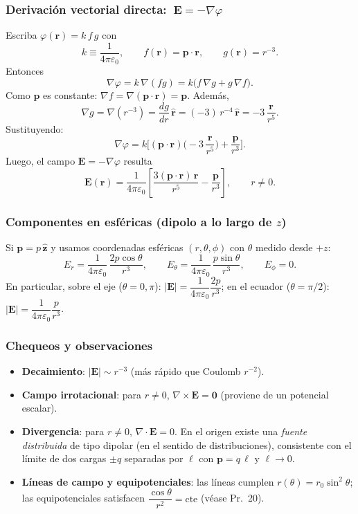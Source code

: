 \documentclass{article}
\begin{document}
\subsubsection*{Derivación vectorial directa: $\ \mathbf E=-\nabla\varphi$}
Escriba $\varphi(\mathbf r)=k\,f\,g$ con
\[
k\equiv\frac{1}{4\pi\varepsilon_0},\qquad
f(\mathbf r)=\mathbf p\!\cdot\!\mathbf r,\qquad
g(\mathbf r)=r^{-3}.
\]
Entonces
\[
\nabla\varphi=k\,\nabla(fg)=k\big(f\,\nabla g+g\,\nabla f\big).
\]
Como $\mathbf p$ es constante: $\nabla f=\nabla(\mathbf p\!\cdot\!\mathbf r)=\mathbf p$.  
Además,
\[
\nabla g=\nabla(r^{-3})=\frac{dg}{dr}\,\hat{\mathbf r}=(-3)\,r^{-4}\,\hat{\mathbf r}
=-3\,\frac{\mathbf r}{r^{5}}.
\]
Sustituyendo:
\[
\nabla\varphi
=k\Big[(\mathbf p\!\cdot\!\mathbf r)\Big(-3\,\frac{\mathbf r}{r^{5}}\Big)
+\frac{\mathbf p}{r^{3}}\Big].
\]
Luego, el campo $\mathbf E=-\nabla\varphi$ resulta
\[
\boxed{\;
\mathbf E(\mathbf r)=\frac{1}{4\pi\varepsilon_0}\left[
\frac{3(\mathbf p\!\cdot\!\mathbf r)\,\mathbf r}{r^{5}}
-\frac{\mathbf p}{r^{3}}
\right],\qquad r\neq 0.\;}
\]

\subsubsection*{Componentes en esféricas (dipolo a lo largo de $z$)}
Si $\mathbf p=p\,\hat{\mathbf z}$ y usamos coordenadas esféricas $(r,\theta,\phi)$ con $\theta$ medido desde $+z$:
\[
\boxed{\;
E_r=\frac{1}{4\pi\varepsilon_0}\,\frac{2p\cos\theta}{r^{3}},\qquad
E_\theta=\frac{1}{4\pi\varepsilon_0}\,\frac{p\sin\theta}{r^{3}},\qquad
E_\phi=0.\;}
\]
En particular, sobre el eje ($\theta=0,\pi$): $|\mathbf E|=\dfrac{1}{4\pi\varepsilon_0}\dfrac{2p}{r^{3}}$;  
en el ecuador ($\theta=\pi/2$): $|\mathbf E|=\dfrac{1}{4\pi\varepsilon_0}\dfrac{p}{r^{3}}$.

\subsubsection*{Chequeos y observaciones}
\begin{itemize}
\item \textbf{Decaimiento}: $|\mathbf E|\sim r^{-3}$ (más rápido que Coulomb $r^{-2}$).
\item \textbf{Campo irrotacional}: para $r\neq 0$, $\nabla\times\mathbf E=\mathbf 0$ (proviene de un potencial escalar).
\item \textbf{Divergencia}: para $r\neq 0$, $\nabla\!\cdot\!\mathbf E=0$. En el origen existe una \emph{fuente distribuida} de tipo dipolar (en el sentido de distribuciones), consistente con el límite de dos cargas $\pm q$ separadas por $\boldsymbol\ell$ con $\mathbf p=q\,\boldsymbol\ell$ y $\boldsymbol\ell\to 0$.
\item \textbf{Líneas de campo y equipotenciales}: las líneas cumplen $r(\theta)=r_0\sin^2\theta$; las equipotenciales satisfacen $\dfrac{\cos\theta}{r^2}=\text{cte}$ (véase Pr.~20).
\end{itemize}
\end{document}
